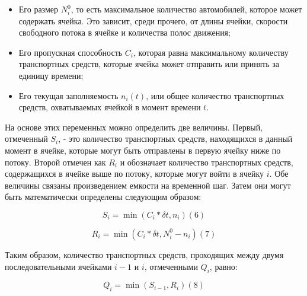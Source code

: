 \begin{itemize}
    \item Его размер $N_i^0$, то есть максимальное количество автомобилей, которое может содержать ячейка. Это зависит, среди прочего, от длины ячейки, скорости свободного потока в ячейке и количества полос движения;
    \item Его пропускная способность $C_i$, которая равна максимальному количеству транспортных средств, которые ячейка может отправить или принять за единицу времени;
    \item Его текущая заполняемость $n_i(t)$, или общее количество транспортных средств, охватываемых ячейкой в момент времени $t$.
\end{itemize}


На основе этих переменных можно определить две величины. Первый, отмеченный $S_i$, - это количество транспортных средств, находящихся в данный момент в ячейке, которые могут быть отправлены в первую ячейку ниже по потоку. Второй отмечен как $R_i$ и обозначает количество транспортных средств, содержащихся в ячейке выше по потоку, которые могут войти в ячейку $i$. Обе величины связаны произведением емкости на временной шаг. Затем они могут быть математически определены следующим образом:

\begin{equation}
    S_i = \min(C_i * \delta t, n_i) (6)
\end{equation}

\begin{equation}
    R_i = \min(C_i * \delta t, N_i^0 − n_i) (7)
\end{equation}


Таким образом, количество транспортных средств, проходящих между двумя последовательными ячейками $i−1$ и $i$, отмеченными $Q_i$, равно:

\begin{equation}
    Q_i = \min(S_{i−1},R_i) (8)
\end{equation}

